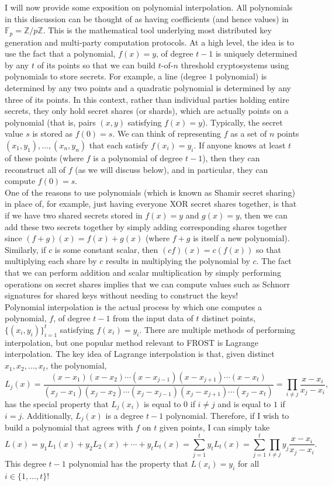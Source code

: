 \documentclass[12pt]{article}
\newcommand{\Z}[0]{\mathbb{Z}}
\newcommand{\F}[0]{\mathbb{F}}
\theoremstyle{definition}
\theoremstyle{remark}
\theoremstyle{definition}
\begin{document}
I will now provide some exposition on polynomial interpolation. All polynomials in this discussion can be thought of as having coefficients (and hence values) in $\F_p = \Z/p\Z$. This is the mathematical tool underlying most distributed key generation and multi-party computation protocols. At a high level, the idea is to use the fact that a polynomial, $f(x) = y$, of degree $t-1$ is uniquely determined by any $t$ of its points so that we can build $t$-of-$n$ threshold cryptosystems using polynomials to store secrets. For example, a line (degree $1$ polynomial) is determined by any two points and a quadratic polynomial is determined by any three of its points. In this context, rather than individual parties holding entire secrets, they only hold secret shares (or shards), which are actually points on a polynomial (that is, pairs $(x, y)$ satisfying $f(x) = y$). Typically, the secret value $s$ is stored as $f(0) = s$. We can think of representing $f$ as a set of $n$ points $(x_1, y_1), \ldots, (x_n, y_n)$ that each satisfy $f(x_i) = y_i$. If anyone knows at least $t$ of these points (where $f$ is a polynomial of degree $t-1$), then they can reconstruct all of $f$ (as we will discuss below), and in particular, they can compute $f(0) = s$.\\

One of the reasons to use polynomials (which is known as Shamir secret sharing) in place of, for example, just having everyone XOR secret shares together, is that if we have two shared secrets stored in $f(x) = y$ and $g(x) = y$, then we can add these two secrets together by simply adding corresponding shares together since $(f+g)(x) = f(x) + g(x)$ (where $f+g$ is itself a new polynomial). Similarly, if $c$ is some constant scalar, then $(cf)(x) = c(f(x))$ so that multiplying each share by $c$ results in multiplying the polynomial by $c$. The fact that we can perform addition and scalar multiplication by simply performing operations on secret shares implies that we can compute values such as Schnorr signatures for shared keys without needing to construct the keys!\\

Polynomial interpolation is the actual process by which one computes a polynomial, $f$, of degree $t-1$ from the input data of $t$ distinct points, $\{(x_i,y_i)\}_{i=1}^t$ satisfying $f(x_i) = y_i$. There are multiple methods of performing interpolation, but one popular method relevant to FROST is Lagrange interpolation. The key idea of Lagrange interpolation is that, given distinct $x_1, x_2,\ldots, x_t$,  the polynomial, $$L_j(x) = \frac{(x-x_1)(x-x_2)\cdots(x-x_{j-1})(x-x_{j+1})\cdots(x-x_t)}{(x_j-x_1)(x_j-x_2)\cdots(x_j-x_{j-1})(x_j-x_{j+1})\cdots(x_j-x_t)} = \prod_{i\neq j}\frac{x-x_i}{x_j - x_i},$$ has the special property that $L_j(x_i)$ is equal to $0$ if $i\neq j$ and is equal to $1$ if $i = j$. Additionally, $L_j(x)$ is a degree $t-1$ polynomial. Therefore, if I wish to build a polynomial that agrees with $f$ on $t$ given points, I can simply take $$L(x) = y_1L_1(x) + y_2L_2(x) + \cdots + y_tL_t(x) = \sum_{j=1}^ty_tL_t(x) = \sum_{j=1}^t\prod_{i\neq j}y_j\frac{x-x_i}{x_j-x_i}.$$ This degree $t-1$ polynomial has the property that $L(x_i) = y_i$ for all $i\in\{1,\ldots, t\}$!\\
\end{document}
